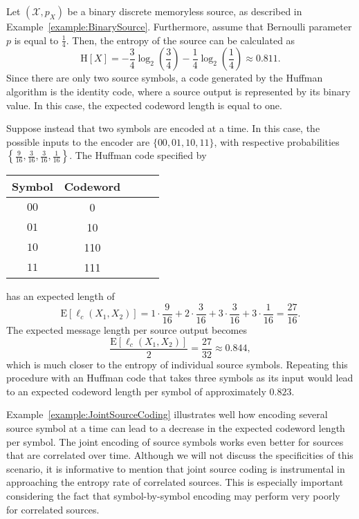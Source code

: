 \begin{example} \label{example:JointSourceCoding}
Let $(\mathcal{X}, p_X)$ be a binary discrete memoryless source, as described in Example~\ref{example:BinarySource}.
Furthermore, assume that Bernoulli parameter $p$ is equal to $\frac{1}{4}$.
Then, the entropy of the source can be calculated as
\begin{equation*}
\mathrm{H}[X] = - \frac{3}{4} \log_2 \left( \frac{3}{4} \right)
- \frac{1}{4} \log_2 \left( \frac{1}{4} \right)
\approx 0.811 .
\end{equation*}
Since there are only two source symbols, a code generated by the Huffman algorithm is the identity code, where a source output is represented by its binary value.
In this case, the expected codeword length is equal to one.

Suppose instead that two symbols are encoded at a time.
In this case, the possible inputs to the encoder are $\{ 00, 01, 10, 11 \}$, with respective probabilities $\left\{ \frac{9}{16}, \frac{3}{16}, \frac{3}{16}, \frac{1}{16} \right\}$.
The Huffman code specified by
\begin{center}
\begin{tabular}{|c|c|c|c|c|}
\hline
Symbol & Codeword \\
\hline
$00$ & 0 \\
$01$ & 10 \\
$10$ & 110 \\
$11$ & 111 \\
\hline
\end{tabular}
\end{center}
has an expected length of
\begin{equation*}
\mathrm{E} [\ell_c (X_1, X_2)] = 1 \cdot \frac{9}{16} + 2 \cdot \frac{3}{16}
+ 3 \cdot \frac{3}{16} + 3 \cdot \frac{1}{16}
= \frac{27}{16} . 
\end{equation*}
The expected message length per source output becomes
\begin{equation*}
\frac{\mathrm{E} [\ell_c (X_1, X_2)]}{2} = \frac{27}{32} \approx 0.844 ,
\end{equation*}
which is much closer to the entropy of individual source symbols.
Repeating this procedure with an Huffman code that takes three symbols as its input would lead to an expected codeword length per symbol of approximately $0.823$.
\end{example}

Example~\ref{example:JointSourceCoding} illustrates well how encoding several source symbol at a time can lead to a decrease in the expected codeword length per symbol.
The joint encoding of source symbols works even better for sources that are correlated over time.
Although we will not discuss the specificities of this scenario, it is informative to mention that joint source coding is instrumental in approaching the entropy rate of correlated sources.
This is especially important considering the fact that symbol-by-symbol encoding may perform very poorly for correlated sources.



